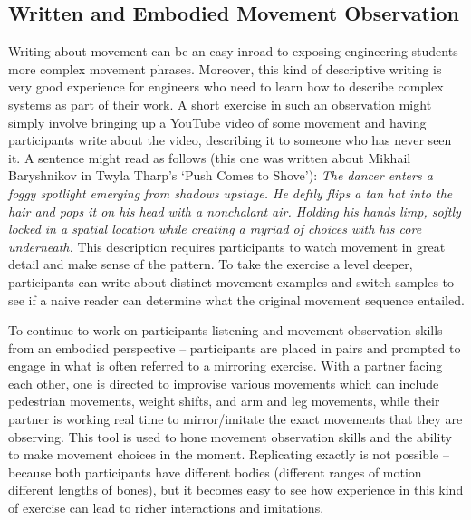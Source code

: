 \documentclass[arts,article,submit,moreauthors,pdftex,10pt,a4paper]{mdpi}
\begin{document}
\subsection{Written and Embodied Movement Observation}
Writing about movement can be an easy inroad to exposing engineering students more complex movement phrases.  Moreover, this kind of descriptive writing is very good experience for engineers who need to learn how to describe complex systems as part of their work.  A short exercise in such an observation might simply involve bringing up a YouTube video of some movement and having participants write about the video, describing it to someone who has never seen it.  A sentence might read as follows (this one was written about Mikhail Baryshnikov in Twyla Tharp's `Push Comes to Shove'):  \textit{The dancer enters a foggy spotlight emerging from shadows upstage.  He deftly flips a tan hat into the hair and pops it on his head with a nonchalant air. Holding his hands limp, softly locked in a spatial location while creating a myriad of choices with his core underneath.}  This description requires participants to watch movement in great detail and make sense of the pattern.  To take the exercise a level deeper, participants can write about distinct movement examples and switch samples to see if a naive reader can determine what the original movement sequence entailed.

To continue to work on participants listening and movement observation skills -- from an embodied perspective -- participants are placed in pairs and prompted to engage in what is often referred to a mirroring exercise. With a partner facing each other, one is directed to improvise various movements which can include pedestrian movements, weight shifts, and arm and leg movements, while their partner is working real time to mirror/imitate the exact movements that they are observing. This tool is used to hone movement observation skills and the ability to make movement choices in the moment.  Replicating exactly is not possible -- because both participants have different bodies (different ranges of motion different lengths of bones), but it becomes easy to see how experience in this kind of exercise can lead to richer interactions and imitations.
\end{document}
